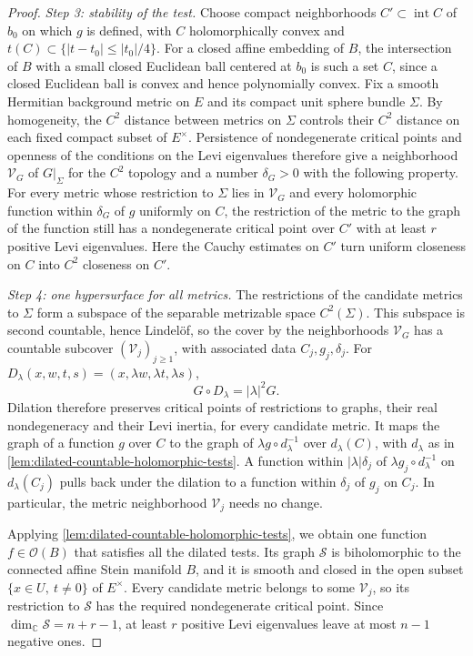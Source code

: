 \begin{proof}
\emph{Step 3: stability of the test.} Choose compact neighborhoods $C'\subset\operatorname{int}C$ of $b_0$ on which $g$ is defined, with $C$ holomorphically convex and $t(C)\subset\{|t-t_0|\leq|t_0|/4\}$. For a closed affine embedding of $B$, the intersection of $B$ with a small closed Euclidean ball centered at $b_0$ is such a set $C$, since a closed Euclidean ball is convex and hence polynomially convex. Fix a smooth Hermitian background metric on $E$ and its compact unit sphere bundle $\Sigma$. By homogeneity, the $C^2$ distance between metrics on $\Sigma$ controls their $C^2$ distance on each fixed compact subset of $E^\times$. Persistence of nondegenerate critical points and openness of the conditions on the Levi eigenvalues therefore give a neighborhood $\mathcal V_G$ of $G|_\Sigma$ for the $C^2$ topology and a number $\delta_G>0$ with the following property. For every metric whose restriction to $\Sigma$ lies in $\mathcal V_G$ and every holomorphic function within $\delta_G$ of $g$ uniformly on $C$, the restriction of the metric to the graph of the function still has a nondegenerate critical point over $C'$ with at least $r$ positive Levi eigenvalues. Here the Cauchy estimates on $C'$ turn uniform closeness on $C$ into $C^2$ closeness on $C'$.

\emph{Step 4: one hypersurface for all metrics.} The restrictions of the candidate metrics to $\Sigma$ form a subspace of the separable metrizable space $C^2(\Sigma)$. This subspace is second countable, hence Lindel\"of, so the cover by the neighborhoods $\mathcal V_G$ has a countable subcover $(\mathcal V_j)_{j\geq1}$, with associated data $C_j,g_j,\delta_j$. For $D_\lambda(x,w,t,s)=(x,\lambda w,\lambda t,\lambda s)$,
\[
 G\circ D_\lambda=|\lambda|^2G.
\]
Dilation therefore preserves critical points of restrictions to graphs, their real nondegeneracy and their Levi inertia, for every candidate metric. It maps the graph of a function $g$ over $C$ to the graph of $\lambda g\circ d_\lambda^{-1}$ over $d_\lambda(C)$, with $d_\lambda$ as in \cref{lem:dilated-countable-holomorphic-tests}. A function within $|\lambda|\delta_j$ of $\lambda g_j\circ d_\lambda^{-1}$ on $d_\lambda(C_j)$ pulls back under the dilation to a function within $\delta_j$ of $g_j$ on $C_j$. In particular, the metric neighborhood $\mathcal V_j$ needs no change.

Applying \cref{lem:dilated-countable-holomorphic-tests}, we obtain one function $f\in\mathcal O(B)$ that satisfies all the dilated tests. Its graph $\mathcal S$ is biholomorphic to the connected affine Stein manifold $B$, and it is smooth and closed in the open subset $\{x\in U,\ t\neq0\}$ of $E^\times$. Every candidate metric belongs to some $\mathcal V_j$, so its restriction to $\mathcal S$ has the required nondegenerate critical point. Since $\dim_{\mathbb C}\mathcal S=n+r-1$, at least $r$ positive Levi eigenvalues leave at most $n-1$ negative ones.
\end{proof}

